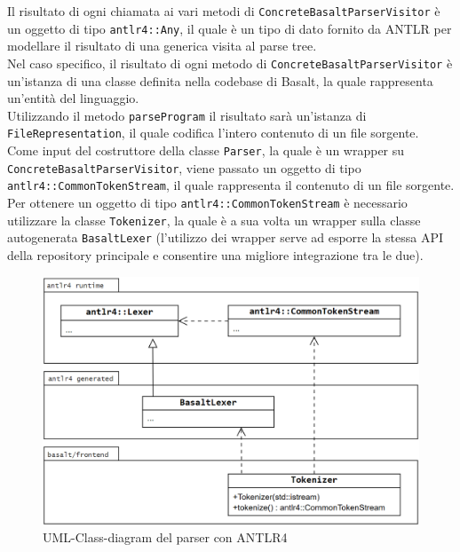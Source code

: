 Il risultato di ogni chiamata ai vari metodi di \texttt{ConcreteBasaltParserVisitor} è
un oggetto di tipo \texttt{antlr4::Any}, il quale è un tipo di dato fornito da ANTLR per 
modellare il risultato di una generica visita al parse tree. \\

Nel caso specifico, il risultato di ogni metodo di \texttt{ConcreteBasaltParserVisitor}
è un'istanza di una classe definita nella codebase di Basalt, la quale rappresenta
un'entità del linguaggio. \\

Utilizzando il metodo \texttt{parseProgram} il risultato sarà un'istanza di 
\texttt{FileRepresentation}, il quale codifica l'intero contenuto di un file sorgente. \\

Come input del costruttore della classe \texttt{Parser}, la quale è un wrapper 
su \texttt{ConcreteBasaltParserVisitor}, viene passato un oggetto di tipo
\texttt{antlr4::CommonTokenStream}, il quale rappresenta il contenuto di un file sorgente. \\

Per ottenere un oggetto di tipo \texttt{antlr4::CommonTokenStream} è necessario
utilizzare la classe \texttt{Tokenizer}, la quale è a sua volta un wrapper sulla classe 
autogenerata \texttt{BasaltLexer} (l'utilizzo dei wrapper serve ad esporre la stessa API
della repository principale e consentire una migliore integrazione tra le due). \\

\begin{figure}[H]
    \centering
        \includegraphics[width=1\textwidth]{../../Assets/ANTLR-TOKENIZER-UML.png} 
    \caption{UML-Class-diagram del parser con ANTLR4}
\end{figure}